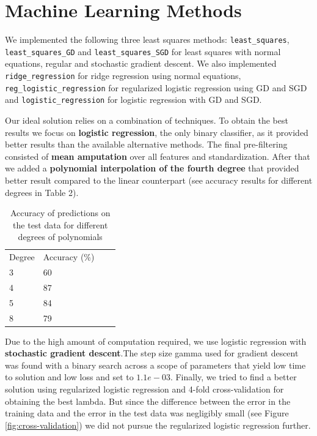 \documentclass[fleqn,9 pt]{SelfArx} %
\begin{document}
\begin{sloppypar}
\section{Machine Learning Methods}
\label{sec-ML}

We implemented the following three least squares methods: \texttt{least\_squares}, \texttt{least\_squares\_GD} and \texttt{least\_squares\_SGD} for least squares with normal equations, regular and stochastic gradient descent. We also implemented \texttt{ridge\_regression} for ridge regression using normal equations, \texttt{reg\_logistic\_regression} for regularized logistic regression using GD and SGD and \texttt{logistic\_regression} for logistic regression with GD and SGD.

Our ideal solution relies on a combination of techniques. To obtain the best results we focus on \textbf{logistic regression}, the only binary classifier, as it provided better results than the available alternative methods. The final pre-filtering consisted of \textbf{mean amputation} over all features and standardization. After that we added a \textbf{polynomial interpolation of the fourth degree} that provided better result compared to the linear counterpart (see accuracy results for different degrees in Table 2). 

\begin{table}
\begin{tabular}{ l l l l | }
Degree & Accuracy (\%) \\
3 & 60 \\
4 & 87 \\
5 & 84 \\
8 & 79 \\
\end{tabular}
\caption{\small Accuracy of predictions on the test data for different degrees of polynomials}
\end{table}

Due to the high amount of computation required, we use logistic regression with \textbf{stochastic gradient descent}.The step size gamma used for gradient descent was found with a binary search across a scope of parameters that yield low time to solution and low loss and set to $1.1e-03$. Finally, we tried to find a better solution using regularized logistic regression and 4-fold cross-validation for obtaining the best lambda. But since the difference between the error in the training data and the error in the test data was negligibly small (see Figure \ref{fig:cross-validation}) we did not pursue the regularized logistic regression further.


\end{sloppypar}
\end{document}
